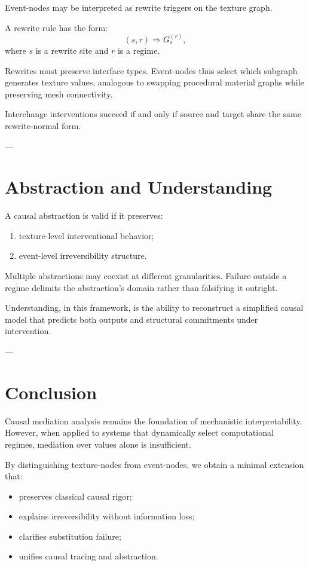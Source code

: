 \documentclass[11pt]{article}
\theoremstyle{remark}
\begin{document}
Event-nodes may be interpreted as rewrite triggers on the texture graph.

A rewrite rule has the form:
\[
(s, r) \Rightarrow G_s^{(r)},
\]
where \(s\) is a rewrite site and \(r\) is a regime.

Rewrites must preserve interface types. Event-nodes thus select which subgraph generates texture values, analogous to swapping procedural material graphs while preserving mesh connectivity.

Interchange interventions succeed if and only if source and target share the same rewrite-normal form.

---

\section{Abstraction and Understanding}

A causal abstraction is valid if it preserves:
\begin{enumerate}
\item texture-level interventional behavior;
\item event-level irreversibility structure.
\end{enumerate}

Multiple abstractions may coexist at different granularities. Failure outside a regime delimits the abstraction’s domain rather than falsifying it outright.

Understanding, in this framework, is the ability to reconstruct a simplified causal model that predicts both outputs and structural commitments under intervention.

---

\section{Conclusion}

Causal mediation analysis remains the foundation of mechanistic interpretability. However, when applied to systems that dynamically select computational regimes, mediation over values alone is insufficient.

By distinguishing texture-nodes from event-nodes, we obtain a minimal extension that:
\begin{itemize}
\item preserves classical causal rigor;
\item explains irreversibility without information loss;
\item clarifies substitution failure;
\item unifies causal tracing and abstraction.
\end{itemize}
\end{document}
